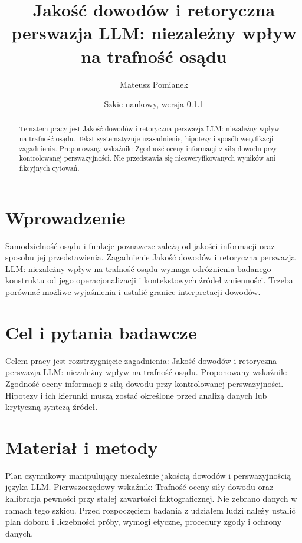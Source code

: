 \documentclass[11pt,a4paper]{article}
\title{Jakość dowodów i retoryczna perswazja LLM: niezależny wpływ na trafność osądu}
\author{Mateusz Pomianek}
\date{Szkic naukowy, wersja 0.1.1}
\begin{document}
\maketitle

\begin{abstract}

Tematem pracy jest Jakość dowodów i retoryczna perswazja LLM: niezależny wpływ na trafność osądu. Tekst systematyzuje uzasadnienie, hipotezy i sposób weryfikacji zagadnienia. Proponowany wskaźnik: Zgodność oceny informacji z siłą dowodu przy kontrolowanej perswazyjności. Nie przedstawia się niezweryfikowanych wyników ani fikcyjnych cytowań.

\end{abstract}

\section{Wprowadzenie}

Samodzielność osądu i funkcje poznawcze zależą od jakości informacji oraz sposobu jej przedstawienia. Zagadnienie Jakość dowodów i retoryczna perswazja LLM: niezależny wpływ na trafność osądu wymaga odróżnienia badanego konstruktu od jego operacjonalizacji i kontekstowych źródeł zmienności. Trzeba porównać możliwe wyjaśnienia i ustalić granice interpretacji dowodów.

\section{Cel i pytania badawcze}

Celem pracy jest rozstrzygnięcie zagadnienia: Jakość dowodów i retoryczna perswazja LLM: niezależny wpływ na trafność osądu. Proponowany wskaźnik: Zgodność oceny informacji z siłą dowodu przy kontrolowanej perswazyjności. Hipotezy i ich kierunki muszą zostać określone przed analizą danych lub krytyczną syntezą źródeł.

\section{Materiał i metody}

Plan czynnikowy manipulujący niezależnie jakością dowodów i perswazyjnością języka LLM. Pierwszorzędowy wskaźnik: Trafność oceny siły dowodu oraz kalibracja pewności przy stałej zawartości faktograficznej. Nie zebrano danych w ramach tego szkicu. Przed rozpoczęciem badania z udziałem ludzi należy ustalić plan doboru i liczebności próby, wymogi etyczne, procedury zgody i ochrony danych.
\end{document}
